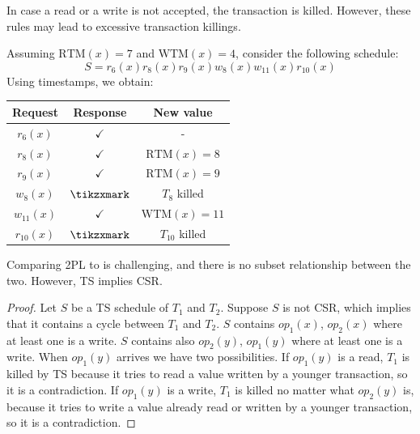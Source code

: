 In case a read or a write is not accepted, the transaction is killed.
However, these rules may lead to excessive transaction killings.
\begin{example}
    Assuming $\text{RTM}(x)=7$ and $\text{WTM}(x)=4$, consider the following schedule:
    \[S=r_6(x) r_8(x) r_9(x) w_8(x) w_{11}(x) r_{10}(x)\]
    Using timestamps, we obtain:
    \begin{table}[H]
        \centering
        \begin{tabular}{ccc}
        \textbf{Request} & \textbf{Response} & \textbf{New value} \\ \hline
        $r_6(x)$         & $\checkmark$      & -                  \\
        $r_8(x)$         & $\checkmark$      & $\text{RTM}(x)=8$         \\
        $r_9(x)$         & $\checkmark$      & $\text{RTM}(x)=9$         \\
        $w_8(x)$         & $\tikzxmark$      & $T_8$ killed       \\
        $w_{11}(x)$      & $\checkmark$      & $\text{WTM}(x)=11$        \\
        $r_{10}(x)$      & $\tikzxmark$      & $T_{10}$ killed   
        \end{tabular}
    \end{table}
\end{example}
Comparing 2PL to is challenging, and there is no subset relationship between the two. 
However, TS implies CSR.
\begin{proof}
    Let $S$ be a TS schedule of $T_1$ and $T_2$. Suppose $S$ is not CSR, which implies that it contains a cycle between $T_1$ and $T_2$. 
    $S$ contains $op_1(x)$, $op_2(x)$ where at least one is a write. 
    $S$ contains also $op_2(y)$, $op_1(y)$ where at least one is a write. 
    When $op_1(y)$ arrives we have two possibilities. 
    If $op_1(y)$ is a read, $T_1$ is killed by TS because it tries to read a value written by a younger transaction, so it is a contradiction. 
    If $op_1(y)$ is a write, $T_1$ is killed no matter what $op_2(y)$ is, because it tries to write a value already read or written by a younger transaction, so it is a contradiction. 
\end{proof}

